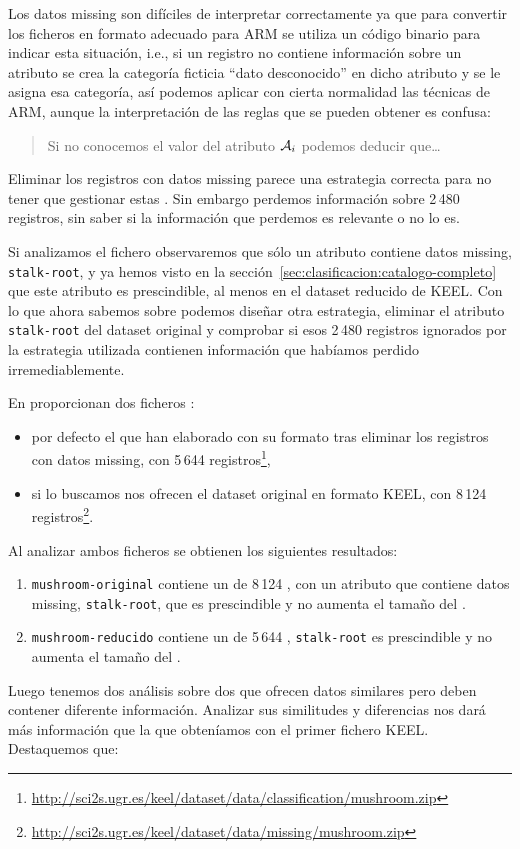 Los datos missing son difíciles de interpretar correctamente ya que para convertir los ficheros en formato adecuado para ARM se utiliza un código binario para indicar esta situación, i.e., si un registro no contiene información sobre un atributo se crea la categoría ficticia "`dato desconocido"' en dicho atributo y se le asigna esa categoría, así podemos aplicar con cierta normalidad las técnicas de ARM, aunque la interpretación de las reglas que se pueden obtener es confusa:

\begin{quote}
Si no conocemos el valor del atributo $\A_i$ podemos deducir que\ldots
\end{quote}

Eliminar los registros con datos missing parece una estrategia correcta para no tener que gestionar estas \ars. Sin embargo perdemos información sobre 2\,480 registros, sin saber si la información que perdemos es relevante o no lo es.

Si analizamos el fichero \mushroom observaremos que sólo un atributo contiene datos missing, \texttt{stalk-root}, y ya hemos visto en la sección~\ref{sec:clasificacion:catalogo-completo} que este atributo es prescindible, al menos en el dataset reducido de KEEL. Con lo que ahora sabemos sobre \catalogos podemos diseñar otra estrategia, eliminar el atributo \texttt{stalk-root} del dataset original y comprobar si esos 2\,480 registros ignorados por la estrategia utilizada contienen información que habíamos perdido irremediablemente.

En  proporcionan dos ficheros \mushroom:
\begin{itemize}
  \item por defecto el que han elaborado con su formato tras eliminar los registros con datos missing, con 5\,644 registros\footnote{\scriptsize\url{http://sci2s.ugr.es/keel/dataset/data/classification/mushroom.zip}},
  \item si lo buscamos nos ofrecen el dataset original en formato KEEL, con 8\,124 registros\footnote{\scriptsize\url{http://sci2s.ugr.es/keel/dataset/data/missing/mushroom.zip}}.
\end{itemize}
Al analizar ambos ficheros se obtienen los siguientes resultados:
\begin{enumerate}
  \item \texttt{mushroom-original} contiene un \sCC de 8\,124 \registros, con un atributo que contiene datos missing, \texttt{stalk-root}, que es prescindible y no aumenta el tamaño del \catalogo.
  \item \texttt{mushroom-reducido} contiene un \sCC de 5\,644 \registros, \texttt{stalk-root} es prescindible y no aumenta el tamaño del \catalogo.
\end{enumerate}
Luego tenemos dos análisis sobre dos \datasets que ofrecen datos similares pero deben contener diferente información. Analizar sus similitudes y diferencias nos dará más información que la que obteníamos con el primer fichero KEEL. Destaquemos que:

